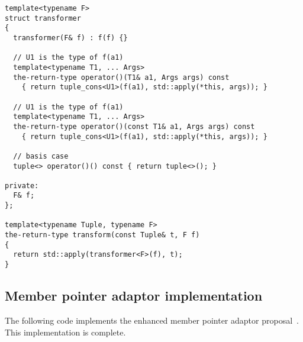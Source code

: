 \documentclass{article}
\begin{document}
\begin{verbatim}
template<typename F>
struct transformer
{
  transformer(F& f) : f(f) {}

  // U1 is the type of f(a1)
  template<typename T1, ... Args>
  the-return-type operator()(T1& a1, Args args) const
    { return tuple_cons<U1>(f(a1), std::apply(*this, args)); }

  // U1 is the type of f(a1)
  template<typename T1, ... Args>
  the-return-type operator()(const T1& a1, Args args) const
    { return tuple_cons<U1>(f(a1), std::apply(*this, args)); }

  // basis case
  tuple<> operator()() const { return tuple<>(); }

private:
  F& f;
};

template<typename Tuple, typename F>
the-return-type transform(const Tuple& t, F f)
{
  return std::apply(transformer<F>(f), t);
}
\end{verbatim}

\subsection{Member pointer adaptor implementation}
\label{mem_fnimpl}
The following code implements the enhanced member pointer adaptor
proposal~\cite{Dimov03a}. This implementation is complete.
\end{document}
